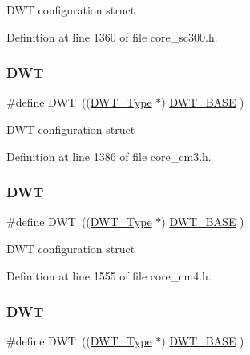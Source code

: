 D\+WT configuration struct 

Definition at line 1360 of file core\+\_\+sc300.\+h.

\mbox{\label{group___c_m_s_i_s__core__base_gabbe5a060185e1d5afa3f85b14e10a6ce}} 
\subsubsection{\texorpdfstring{D\+WT}{DWT}\hspace{0.1cm}{\footnotesize\ttfamily [2/4]}}
{\footnotesize\ttfamily \#define D\+WT~((\hyperlink{struct_d_w_t___type}{D\+W\+T\+\_\+\+Type}       $\ast$)     \hyperlink{group___c_m_s_i_s__core__base_gafdab534f961bf8935eb456cb7700dcd2}{D\+W\+T\+\_\+\+B\+A\+SE}      )}

D\+WT configuration struct 

Definition at line 1386 of file core\+\_\+cm3.\+h.

\mbox{\label{group___c_m_s_i_s__core__base_gabbe5a060185e1d5afa3f85b14e10a6ce}} 
\subsubsection{\texorpdfstring{D\+WT}{DWT}\hspace{0.1cm}{\footnotesize\ttfamily [3/4]}}
{\footnotesize\ttfamily \#define D\+WT~((\hyperlink{struct_d_w_t___type}{D\+W\+T\+\_\+\+Type}       $\ast$)     \hyperlink{group___c_m_s_i_s__core__base_gafdab534f961bf8935eb456cb7700dcd2}{D\+W\+T\+\_\+\+B\+A\+SE}      )}

D\+WT configuration struct 

Definition at line 1555 of file core\+\_\+cm4.\+h.

\mbox{\label{group___c_m_s_i_s__core__base_gabbe5a060185e1d5afa3f85b14e10a6ce}} 
\subsubsection{\texorpdfstring{D\+WT}{DWT}\hspace{0.1cm}{\footnotesize\ttfamily [4/4]}}
{\footnotesize\ttfamily \#define D\+WT~((\hyperlink{struct_d_w_t___type}{D\+W\+T\+\_\+\+Type}       $\ast$)     \hyperlink{group___c_m_s_i_s__core__base_gafdab534f961bf8935eb456cb7700dcd2}{D\+W\+T\+\_\+\+B\+A\+SE}      )}

